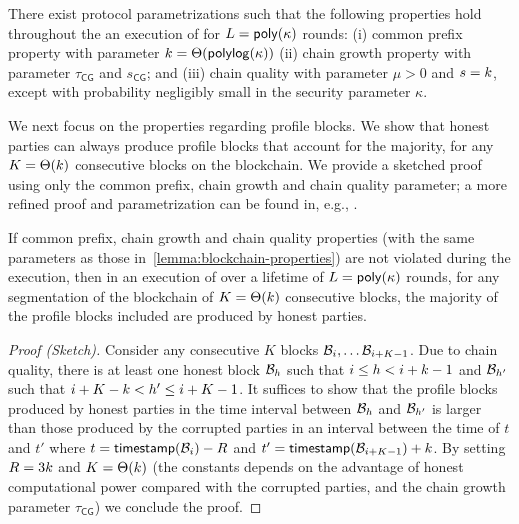 \begin{lemma} \label{lemma:blockchain-properties}
	There exist protocol parametrizations such that the following properties hold throughout the an execution of \protocFairLedger for $L = \mathsf{poly}(\kappa)$ rounds: (i) common prefix property with parameter $k = \Theta(\mathsf{polylog}(\kappa))$ (ii) chain growth property with parameter $\tau_{\mathsf{CG}}$ and $s_{\mathsf{CG}}$; and (iii) chain quality with parameter $\mu > 0$ and $s = k$, except with probability negligibly small in the security parameter $\kappa$.
\end{lemma}

We next focus on the properties regarding profile blocks.
%
We show that honest parties can always produce profile blocks that account for the majority, for any $K = \Theta(k)$ consecutive blocks on the blockchain.
%
We provide a sketched proof using only the common prefix, chain growth and chain quality parameter; a more refined proof and parametrization can be found in, e.g., \cite{PODC:PasShi17,EC:KiaLeoShe24}.

\begin{lemma}
	\label{lemma:good-profile-blocks}
	If common prefix, chain growth and chain quality properties (with the same parameters as those in~\cref{lemma:blockchain-properties}) are not violated during the execution, then in an execution of \protocFairLedger over a lifetime of $L = \mathsf{poly}(\kappa)$ rounds, for any segmentation of the blockchain of $K = \Theta(k)$ consecutive blocks, the majority of the profile blocks included are produced by honest parties.
\end{lemma}


\begin{proof}[Proof (Sketch)]
	Consider any consecutive $K$ blocks $\mathcal{B}_i, \ldots \mathcal{B}_{i + K -1}$.
	Due to chain quality, there is at least one honest block $\mathcal{B}_h$ such that  $i \le h < i + k -1 $ and $\mathcal{B}_{h'}$ such that $i + K - k < h' \le i + K - 1$.
	It suffices to show that the profile blocks produced by honest parties in the time interval between $\mathcal{B}_h$ and $\mathcal{B}_{h'}$ is larger than those produced by the corrupted parties in an interval between the time of $t$ and $t'$ where $t = \mathsf{timestamp}(\mathcal{B}_i) - R$ and $t' = \mathsf{timestamp}(\mathcal{B}_{i + K - 1}) + k$.
	By setting $R = 3k$ and $K = \Theta(k)$ (the constants depends on the advantage of honest computational power compared with the corrupted parties, and the chain growth parameter $\tau_{\mathsf{CG}}$) we conclude the proof.
\end{proof}


